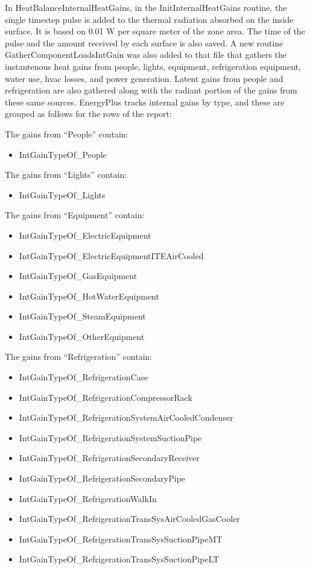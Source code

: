 In HeatBalanceInternalHeatGains, in the InitInternalHeatGains routine, the single timestep pulse is added to the thermal radiation absorbed on the inside surface. It is based on 0.01 W per square meter of the zone area. The time of the pulse and the amount received by each surface is also saved. A new routine GatherComponentLoadsIntGain was also added to that file that gathers the instantenous heat gains from people, lights, equipment, refrigeration equipment, water use, hvac losses, and power generation. Latent gains from people and refrigeration are also gathered along with the radiant portion of the gains from these same sources. EnergyPlus tracks internal gains by type, and these are grouped as follows for the rows of the report:

The gains from ``People'' contain:

\begin{itemize}
\tightlist
\item
  IntGainTypeOf\_People
\end{itemize}

The gains from ``Lights'' contain:

\begin{itemize}
\tightlist
\item
  IntGainTypeOf\_Lights
\end{itemize}

The gains from ``Equipment'' contain:

\begin{itemize}
\item
  IntGainTypeOf\_ElectricEquipment
\item
  IntGainTypeOf\_ElectricEquipmentITEAirCooled
\item
  IntGainTypeOf\_GasEquipment
\item
  IntGainTypeOf\_HotWaterEquipment
\item
  IntGainTypeOf\_SteamEquipment
\item
  IntGainTypeOf\_OtherEquipment
\end{itemize}

The gains from ``Refrigeration'' contain:

\begin{itemize}
\item
  IntGainTypeOf\_RefrigerationCase
\item
  IntGainTypeOf\_RefrigerationCompressorRack
\item
  IntGainTypeOf\_RefrigerationSystemAirCooledCondenser
\item
  IntGainTypeOf\_RefrigerationSystemSuctionPipe
\item
  IntGainTypeOf\_RefrigerationSecondaryReceiver
\item
  IntGainTypeOf\_RefrigerationSecondaryPipe
\item
  IntGainTypeOf\_RefrigerationWalkIn
\item
  IntGainTypeOf\_RefrigerationTransSysAirCooledGasCooler
\item
  IntGainTypeOf\_RefrigerationTransSysSuctionPipeMT
\item
  IntGainTypeOf\_RefrigerationTransSysSuctionPipeLT
\end{itemize}

